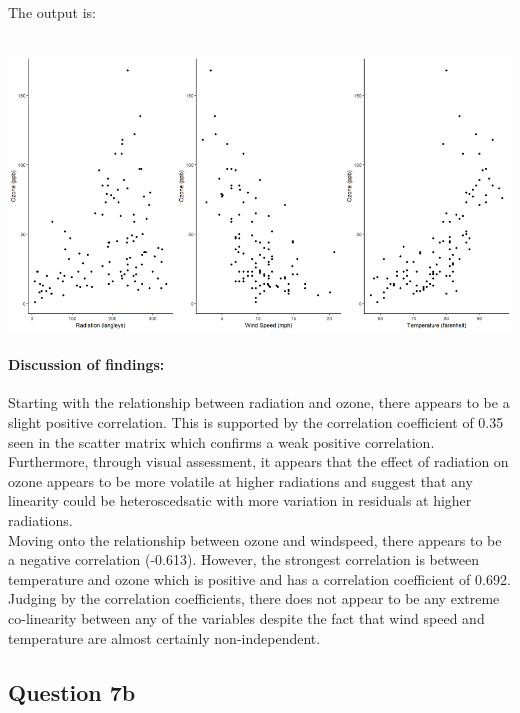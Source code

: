 \documentclass[
]{article}
\begin{document}
The output is:\\
\strut \\
\includegraphics{images/ozone_relationships.png}\\

\paragraph{Discussion of findings:}\label{discussion-of-findings}

Starting with the relationship between radiation and ozone, there
appears to be a slight positive correlation. This is supported by the
correlation coefficient of 0.35 seen in the scatter matrix which
confirms a weak positive correlation. Furthermore, through visual
assessment, it appears that the effect of radiation on ozone appears to
be more volatile at higher radiations and suggest that any linearity
could be heteroscedsatic with more variation in residuals at higher
radiations.\\

Moving onto the relationship between ozone and windspeed, there appears
to be a negative correlation (-0.613). However, the strongest
correlation is between temperature and ozone which is positive and has a
correlation coefficient of 0.692.\\

Judging by the correlation coefficients, there does not appear to be any
extreme co-linearity between any of the variables despite the fact that
wind speed and temperature are almost certainly non-independent.\\

\hfill\break
\hfill\break
\hfill\break

\subsection{Question 7b}\label{question-7b}
\end{document}

